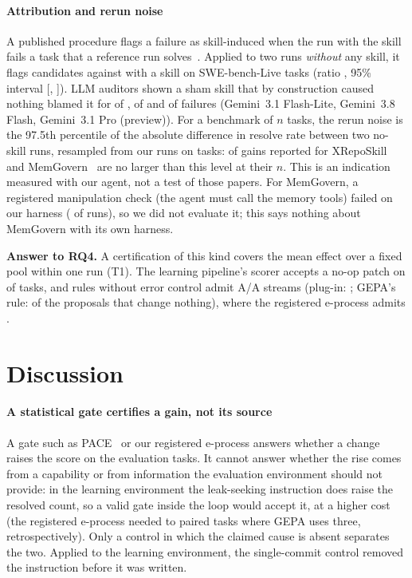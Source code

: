 \documentclass[sigconf,review,anonymous]{acmart}
\newcommand{\agentmodel}{Gemini~3.1 Flash-Lite}
\newcommand{\promodel}{Gemini~3.1 Pro (preview)}
\newcommand{\flashmodel}{Gemini~3.8 Flash}
\begin{document}
\paragraph{Attribution and rerun noise}
A published procedure flags a failure as skill-induced when the run with the skill fails a task that
a reference run solves~\cite{skill_induced_failures_2026}. Applied to two runs \emph{without} any
skill, it flags \nattrPlacebo{} candidates against \nattrSkill{} with a skill on \nattrTasks{}
SWE-bench-Live tasks (ratio \nattrR{}, 95\% interval [\nattrRLo{}, \nattrRHi{}]). LLM auditors shown a
sham skill that by construction caused nothing blamed it for \nshamLiteK{} of \nshamLiteN{},
\nshamFlashK{} of \nshamFlashN{} and \nshamProK{} of \nshamProN{} failures (\agentmodel{},
\flashmodel{}, \promodel{}). For a benchmark of $n$ tasks, the rerun noise is the 97.5th percentile
of the absolute difference in resolve rate between two no-skill runs, resampled from our runs on
\nnoiseTasks{} tasks: \nnoiseWithin{} of \nnoiseClaims{} gains reported for XRepoSkill and
MemGovern~\cite{xreposkill,memgovern_repo} are no larger than this level at their $n$. This is an
indication measured with our agent, not a test of those papers. For MemGovern, a registered
manipulation check (the agent must call the memory tools) failed on our harness (\nmgUsed{} of
\nmgRuns{} runs), so we did not evaluate it; this says nothing about MemGovern with its own harness.

\noindent\textbf{Answer to RQ4.} A certification of this kind covers the mean effect over a fixed
pool within one run (T1). The learning pipeline's scorer accepts a no-op patch on \nfzeroLNoop{} of
\nfzeroN{} tasks, and rules without error control admit A/A streams (plug-in: \npluginOnce{}; GEPA's
rule: \ngepaNoop{} of the proposals that change nothing), where the registered e-process admits
\ngkAdmitAA{}.

\section{Discussion}\label{sec:discussion}
\paragraph{A statistical gate certifies a gain, not its source}
A gate such as PACE~\cite{pace_paired_anytime_gate} or our registered e-process answers whether a change raises
the score on the evaluation tasks. It cannot answer whether the rise comes from a capability or from
information the evaluation environment should not provide: in the learning environment the
leak-seeking instruction does raise the resolved count, so a valid gate inside the loop would accept
it, at a higher cost (the registered e-process needed \njinjaAdmit{} to \nbleveLFAdmit{} paired
tasks where GEPA uses three, retrospectively). Only a control in which the claimed cause is absent
separates the two. Applied to the learning environment, the single-commit control removed the
instruction before it was written.
\end{document}
